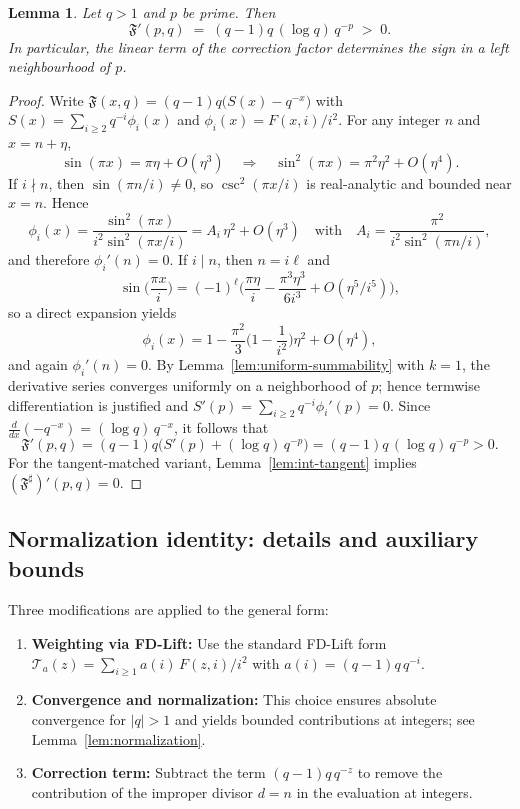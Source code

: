 \documentclass[11pt,a4paper]{amsart}
\newcommand{\Fbase}{\mathfrak F}
\newcommand{\Fsharp}{\Fbase^{\sharp}}
\theoremstyle{plain}
\newtheorem{lemma}[theorem]{Lemma}
\theoremstyle{definition}
\theoremstyle{remark}
\begin{document}
\begin{lemma}\label{lem:derivative-at-prime}
Let $q>1$ and $p$ be prime. Then
\[
\mathfrak F'(p,q)\;=\;(q-1)q\,(\log q)\,q^{-p}\;>\;0.
\]
In particular, the linear term of the correction factor determines the sign in a left neighbourhood of $p$.
\end{lemma}
\begin{proof}
Write $\mathfrak F(x,q)=(q-1)q\big(S(x)-q^{-x}\big)$ with $S(x)=\sum_{i\ge2}q^{-i}\phi_i(x)$ and $\phi_i(x)=F(x,i)/i^2$. For any integer $n$ and $x=n+\eta$,
\[
\sin(\pi x)=\pi\eta+O(\eta^3)\quad\Rightarrow\quad \sin^2(\pi x)=\pi^2\eta^2+O(\eta^4).
\]
If $i\nmid n$, then $\sin(\pi n/i)\neq 0$, so $\csc^2(\pi x/i)$ is real-analytic and bounded near $x=n$. Hence
\[
\phi_i(x)=\frac{\sin^2(\pi x)}{i^2\sin^2(\pi x/i)}=A_i\,\eta^2+O(\eta^3)\quad\text{with}\quad A_i=\frac{\pi^2}{i^2\sin^2(\pi n/i)},
\]
and therefore $\phi_i'(n)=0$. If $i\mid n$, then $n=i\ell$ and
\[
\sin\!\Big(\frac{\pi x}{i}\Big)=(-1)^\ell\Big(\frac{\pi\eta}{i}-\frac{\pi^3\eta^3}{6i^3}+O(\eta^5/i^5)\Big),
\]
so a direct expansion yields
\[
\phi_i(x)=1-\frac{\pi^2}{3}\Big(1-\frac{1}{i^2}\Big)\eta^2+O(\eta^4),
\]
and again $\phi_i'(n)=0$. By Lemma~\ref{lem:uniform-summability} with $k=1$, the derivative series converges uniformly on a neighborhood of $p$; hence termwise differentiation is justified and $S'(p)=\sum_{i\ge2}q^{-i}\phi_i'(p)=0$. Since $\frac{d}{dx}(-q^{-x})=(\log q)\,q^{-x}$, it follows that
\[
\mathfrak F'(p,q)=(q-1)q\Big(S'(p)+(\log q)\,q^{-p}\Big)=(q-1)q\,(\log q)\,q^{-p}>0.
\]
For the tangent-matched variant, Lemma~\ref{lem:int-tangent} implies $(\Fsharp)'(p,q)=0$.
\end{proof}

\subsection{Normalization identity: details and auxiliary bounds}\label{app:prime-construction}
Three modifications are applied to the general form:
\begin{enumerate}
    \item \textbf{Weighting via FD-Lift:} Use the standard FD-Lift form $\mathcal{T}_a(z)=\sum_{i\ge1} a(i)\,F(z,i)/i^2$ with $a(i)=(q-1)q\,q^{-i}$.
    \item \textbf{Convergence and normalization:} This choice ensures absolute convergence for $|q|>1$ and yields bounded contributions at integers; see Lemma~\ref{lem:normalization}.
    \item \textbf{Correction term:} Subtract the term $(q-1)q\,q^{-z}$ to remove the contribution of the improper divisor $d=n$ in the evaluation at integers.
\end{enumerate}
\end{document}
